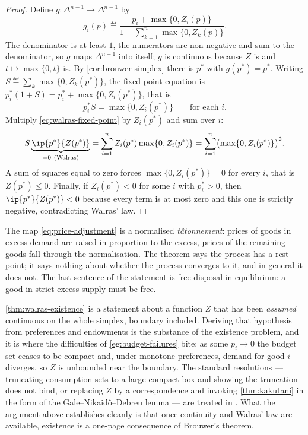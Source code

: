 \begin{proof}
	Define $g\colon\Delta^{n-1}\to\Delta^{n-1}$ by
	\begin{equation}\label{eq:price-adjustment}
		g_i(p)\eqdef\frac{p_i+\max\{0,Z_i(p)\}}{1+\sum_{k=1}^{n}\max\{0,Z_k(p)\}} .
	\end{equation}
	The denominator is at least $1$, the numerators are non-negative and sum to the
	denominator, so $g$ maps $\Delta^{n-1}$ into itself; $g$ is continuous because
	$Z$ is and $t\mapsto\max\{0,t\}$ is. By \autoref{cor:brouwer-simplex} there is
	$p^{\ast}$ with $g(p^{\ast})=p^{\ast}$. Writing
	$S\eqdef\sum_{k}\max\{0,Z_k(p^{\ast})\}$, the fixed-point equation is
	$p^{\ast}_i(1+S)=p^{\ast}_i+\max\{0,Z_i(p^{\ast})\}$, that is
	\begin{equation}\label{eq:walras-fixed-point}
		p^{\ast}_iS=\max\{0,Z_i(p^{\ast})\}\qquad\text{for each }i .
	\end{equation}
	Multiply \eqref{eq:walras-fixed-point} by $Z_i(p^{\ast})$ and sum over $i$:
	\[
		S\underbrace{\ip{p^{\ast}}{Z(p^{\ast})}}_{=0\ \text{(Walras)}}
		=\sum_{i=1}^{n}Z_i(p^{\ast})\max\{0,Z_i(p^{\ast})\}
		=\sum_{i=1}^{n}\bigl(\max\{0,Z_i(p^{\ast})\}\bigr)^{2} .
	\]
	A sum of squares equal to zero forces $\max\{0,Z_i(p^{\ast})\}=0$ for every $i$,
	that is $Z(p^{\ast})\leq0$. Finally, if $Z_i(p^{\ast})<0$ for some $i$ with
	$p^{\ast}_i>0$, then $\ip{p^{\ast}}{Z(p^{\ast})}<0$ because every term is at
	most zero and this one is strictly negative, contradicting Walras' law.
\end{proof}

The map \eqref{eq:price-adjustment} is a normalised \emph{t\^atonnement}: prices
of goods in excess demand are raised in proportion to the excess, prices of the
remaining goods fall through the normalisation. The theorem says the process has
a rest point; it says nothing about whether the process converges to it, and in
general it does not. The last sentence of the statement is free disposal in
equilibrium: a good in strict excess supply must be free.

\begin{remark}\label{rem:walras-caveats}
	\autoref{thm:walras-existence} is a statement about a function $Z$ that has been
	\emph{assumed} continuous on the whole simplex, boundary included. Deriving that
	hypothesis from preferences and endowments is the substance of the existence
	problem, and it is where the difficulties of \autoref{eg:budget-failures} bite:
	as some $p_i\to0$ the budget set ceases to be compact and, under monotone
	preferences, demand for good $i$ diverges, so $Z$ is unbounded near the
	boundary. The standard resolutions --- truncating consumption sets to a large
	compact box and showing the truncation does not bind, or replacing $Z$ by a
	correspondence and invoking \autoref{thm:kakutani} in the form of the
	Gale--Nikaid\^o--Debreu lemma --- are treated in
	\textcite[Ch.~17]{aliprantis2006infinite}. What the argument above establishes
	cleanly is that once continuity and Walras' law are available, existence is a
	one-page consequence of Brouwer's theorem.
\end{remark}

